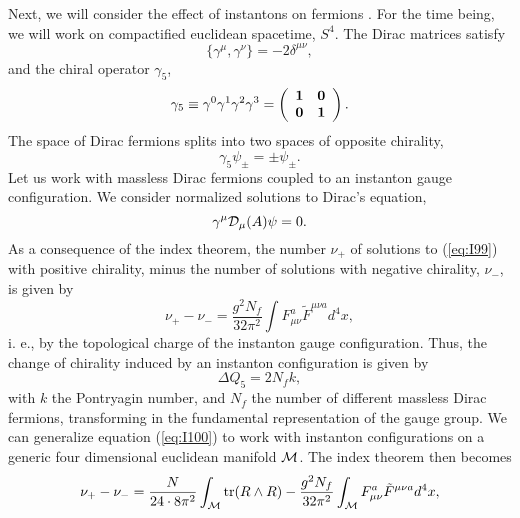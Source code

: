 Next, we will consider the effect of instantons on fermions \cite{cl,tHpseudo}. For
the time being, we will work on compactified euclidean spacetime, 
$S^4$. The Dirac matrices satisfy
\begin{equation}
\{\gamma^{\mu},\gamma^{\nu}\}=-2 \delta^{\mu \nu},
\label{eq:I96}
\end{equation}
and the chiral operator $\gamma_5$,
\begin{equation}
\gamma_5 \equiv \gamma^0 \gamma^1 \gamma^2 \gamma^3 = \left(
	\begin{array}{cc} {\bf 1} & {\bf 0} \\
			  {\bf 0} & {\bf 1}
	\end{array} \right).
\label{eq:I97}
\end{equation}
The space of Dirac fermions splits into two spaces of opposite
chirality,
\begin{equation}
\gamma_5 \psi_{\pm} = \pm \psi_{\pm}.
\label{eq:I98}
\end{equation}
Let us work with massless Dirac fermions coupled to an
instanton gauge configuration. We consider normalized
solutions to Dirac's equation,
\begin{equation}
\gamma^{\mu} {\cal D}_{\mu}(A) \psi = 0.
\label{eq:I99}
\end{equation}
As a consequence of the index theorem, the number $\nu_+$ of solutions 
to (\ref{eq:I99}) with positive chirality, minus the number of solutions 
with negative chirality, $\nu_-$, is given by
\begin{equation}
\nu_+ -  \nu_- = \frac {g^2 N_f}{32 \pi^2} \int F^{a}_{\mu \nu} \tilde{F}
^{\mu \nu a} d^4 x,
\label{eq:I100}
\end{equation}
i. e., by the topological charge of the instanton gauge configuration. 
Thus, the change of chirality induced by an instanton configuration 
is given by
\begin{equation}
\Delta Q_5 = 2 N_f k,
\label{eq:I101}
\end{equation}
with $k$ the Pontryagin number, and $N_f$ the number of different 
massless Dirac fermions, transforming in the fundamental representation 
of the gauge group. We can generalize equation (\ref{eq:I100}) to work with 
instanton configurations on a generic four dimensional euclidean 
manifold ${\cal M}$. The index theorem then becomes
\begin{equation}
\nu_+ - \nu_- = \frac {N}{24 \cdot 8 \pi^2} \int_{\cal M} 
\hbox {tr} (R \wedge R) - \frac {g^2 N_f}{32 \pi^2} \int_{\cal M}
 F^{a}_{\mu \nu} \tilde{F}^{\mu \nu a} d^4 x,
\label{eq:I102}
\end{equation}
